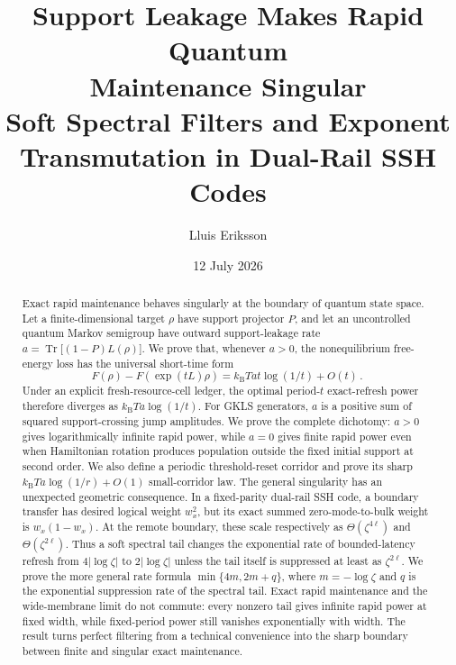 \documentclass[11pt,a4paper]{article}
\title{\textcolor{ink}{\bfseries Support Leakage Makes Rapid Quantum\\Maintenance Singular}\\[0.5em]\large Soft Spectral Filters and Exponent Transmutation in Dual-Rail SSH Codes}
\author{Lluis Eriksson}
\affil{Independent Researcher}
\date{12 July 2026}
\theoremstyle{remark}
\begin{document}
\maketitle
\begin{abstract}
Exact rapid maintenance behaves singularly at the boundary of quantum state space. Let a finite-dimensional target $\rho$ have support projector $P$, and let an uncontrolled quantum Markov semigroup have outward support-leakage rate $a=\operatorname{Tr}\bigl[(1-P)L(\rho)\bigr]$. We prove that, whenever $a>0$, the nonequilibrium free-energy loss has the universal short-time form
\[
F(\rho)-F(\exp(tL)\rho)=k_{\mathrm B} T a t \log(1/t)+O(t)\mathpunct{.}
\]
Under an explicit fresh-resource-cell ledger, the optimal period-$t$ exact-refresh power therefore diverges as $k_{\mathrm B} T a \log(1/t)$. For GKLS generators, $a$ is a positive sum of squared support-crossing jump amplitudes. We prove the complete dichotomy: $a>0$ gives logarithmically infinite rapid power, while $a=0$ gives finite rapid power even when Hamiltonian rotation produces population outside the fixed initial support at second order. We also define a periodic threshold-reset corridor and prove its sharp $k_{\mathrm B} T a \log(1/r)+O(1)$ small-corridor law.
The general singularity has an unexpected geometric consequence. In a fixed-parity dual-rail SSH code, a boundary transfer has desired logical weight $w_x^{2}$, but its exact summed zero-mode-to-bulk weight is $w_x(1-w_x)$. At the remote boundary, these scale respectively as $\Theta(\zeta^{4\ell})$ and $\Theta(\zeta^{2\ell})$. Thus a soft spectral tail changes the exponential rate of bounded-latency refresh from $4|\log \zeta|$ to $2|\log \zeta|$ unless the tail itself is suppressed at least as $\zeta^{2\ell}$. We prove the more general rate formula $\min\{4m,2m+q\}$, where $m=-\log \zeta$ and $q$ is the exponential suppression rate of the spectral tail. Exact rapid maintenance and the wide-membrane limit do not commute: every nonzero tail gives infinite rapid power at fixed width, while fixed-period power still vanishes exponentially with width. The result turns perfect filtering from a technical convenience into the sharp boundary between finite and singular exact maintenance.
\end{abstract}
\end{document}
